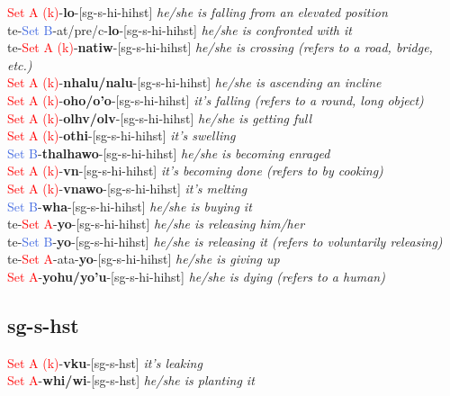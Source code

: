\documentclass[oneside,openany]{book}%
\begin{document}
\textcolor{Red}{Set A (k)}{-}\textbf{lo}{-}[sg-s-hi-hihst] \textit{ he/she is falling from an elevated position} \\%
te{-}\textcolor{RoyalBlue}{Set B}{-}at/pre/c{-}\textbf{lo}{-}[sg-s-hi-hihst] \textit{ he/she is confronted with it} \\%
te{-}\textcolor{Red}{Set A (k)}{-}\textbf{natiw}{-}[sg-s-hi-hihst] \textit{ he/she is crossing (refers to a road, bridge, etc.)} \\%
\textcolor{Red}{Set A (k)}{-}\textbf{nhalu/nalu}{-}[sg-s-hi-hihst] \textit{ he/she is ascending an incline} \\%
\textcolor{Red}{Set A (k)}{-}\textbf{oho/o'o}{-}[sg-s-hi-hihst] \textit{ it's falling (refers to a round, long object)} \\%
\textcolor{Red}{Set A (k)}{-}\textbf{olhv/olv}{-}[sg-s-hi-hihst] \textit{ he/she is getting full} \\%
\textcolor{Red}{Set A (k)}{-}\textbf{othi}{-}[sg-s-hi-hihst] \textit{ it's swelling} \\%
\textcolor{RoyalBlue}{Set B}{-}\textbf{thalhawo}{-}[sg-s-hi-hihst] \textit{ he/she is becoming enraged} \\%
\textcolor{Red}{Set A (k)}{-}\textbf{vn}{-}[sg-s-hi-hihst] \textit{ it's becoming done (refers to by cooking)} \\%
\textcolor{Red}{Set A (k)}{-}\textbf{vnawo}{-}[sg-s-hi-hihst] \textit{ it's melting} \\%
\textcolor{RoyalBlue}{Set B}{-}\textbf{wha}{-}[sg-s-hi-hihst] \textit{ he/she is buying it} \\%
te{-}\textcolor{Red}{Set A}{-}\textbf{yo}{-}[sg-s-hi-hihst] \textit{ he/she is releasing him/her} \\%
te{-}\textcolor{RoyalBlue}{Set B}{-}\textbf{yo}{-}[sg-s-hi-hihst] \textit{ he/she is releasing it (refers to voluntarily releasing)} \\%
te{-}\textcolor{Red}{Set A}{-}ata{-}\textbf{yo}{-}[sg-s-hi-hihst] \textit{ he/she is giving up} \\%
\textcolor{Red}{Set A}{-}\textbf{yohu/yo'u}{-}[sg-s-hi-hihst] \textit{ he/she is dying (refers to a human)} \\%
\vspace{1em}%
\needspace{1in}%
\subsection*{sg-s-hst}%
\textcolor{Red}{Set A (k)}{-}\textbf{vku}{-}[sg-s-hst] \textit{ it's leaking} \\%
\textcolor{Red}{Set A}{-}\textbf{whi/wi}{-}[sg-s-hst] \textit{ he/she is planting it} \\%
\vspace{1em}%
\needspace{1in}%
\end{document}
